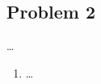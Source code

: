 \documentclass[a4paper,10pt]{article}
\begin{document}

\subsection*{Problem 2}

 \ldots
 
\begin{enumerate}[label= (\alph*)]

 \item \ldots

\end{enumerate}

\end{document}
